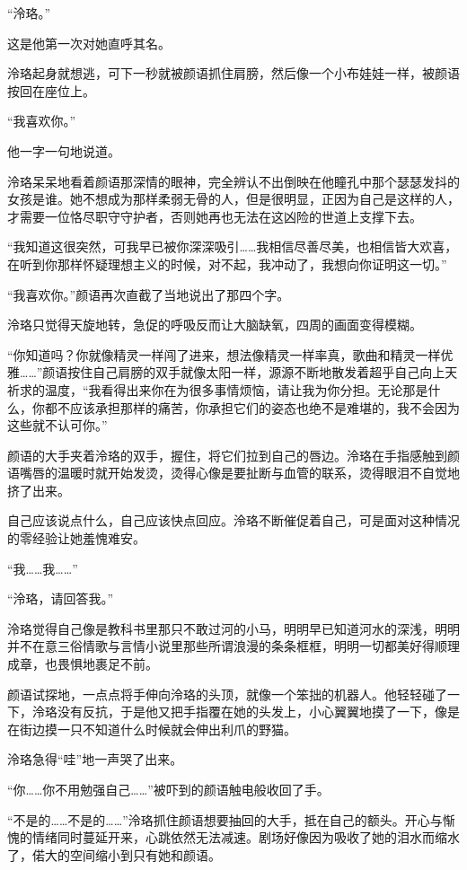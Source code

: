 \documentclass[UTF8, scheme = chinese, openany]{ctexbook}
\begin{document}
“泠珞。”

这是他第一次对她直呼其名。

泠珞起身就想逃，可下一秒就被颜语抓住肩膀，然后像一个小布娃娃一样，被颜语按回在座位上。

“我喜欢你。”

他一字一句地说道。

泠珞呆呆地看着颜语那深情的眼神，完全辨认不出倒映在他瞳孔中那个瑟瑟发抖的女孩是谁。她不想成为那样柔弱无骨的人，但是很明显，正因为自己是这样的人，才需要一位恪尽职守守护者，否则她再也无法在这凶险的世道上支撑下去。

“我知道这很突然，可我早已被你深深吸引……我相信尽善尽美，也相信皆大欢喜，在听到你那样怀疑理想主义的时候，对不起，我冲动了，我想向你证明这一切。”

“我喜欢你。”颜语再次直截了当地说出了那四个字。

泠珞只觉得天旋地转，急促的呼吸反而让大脑缺氧，四周的画面变得模糊。

“你知道吗？你就像精灵一样闯了进来，想法像精灵一样率真，歌曲和精灵一样优雅……”颜语按住自己肩膀的双手就像太阳一样，源源不断地散发着超乎自己向上天祈求的温度，“我看得出来你在为很多事情烦恼，请让我为你分担。无论那是什么，你都不应该承担那样的痛苦，你承担它们的姿态也绝不是难堪的，我不会因为这些就不认可你。”

颜语的大手夹着泠珞的双手，握住，将它们拉到自己的唇边。泠珞在手指感触到颜语嘴唇的温暖时就开始发烫，烫得心像是要扯断与血管的联系，烫得眼泪不自觉地挤了出来。

自己应该说点什么，自己应该快点回应。泠珞不断催促着自己，可是面对这种情况的零经验让她羞愧难安。

“我……我……”

“泠珞，请回答我。”

泠珞觉得自己像是教科书里那只不敢过河的小马，明明早已知道河水的深浅，明明并不在意三俗情歌与言情小说里那些所谓浪漫的条条框框，明明一切都美好得顺理成章，也畏惧地裹足不前。

颜语试探地，一点点将手伸向泠珞的头顶，就像一个笨拙的机器人。他轻轻碰了一下，泠珞没有反抗，于是他又把手指覆在她的头发上，小心翼翼地摸了一下，像是在街边摸一只不知道什么时候就会伸出利爪的野猫。

泠珞急得“哇”地一声哭了出来。

“你……你不用勉强自己……”被吓到的颜语触电般收回了手。

“不是的……不是的……”泠珞抓住颜语想要抽回的大手，抵在自己的额头。开心与惭愧的情绪同时蔓延开来，心跳依然无法减速。剧场好像因为吸收了她的泪水而缩水了，偌大的空间缩小到只有她和颜语。
\end{document}
